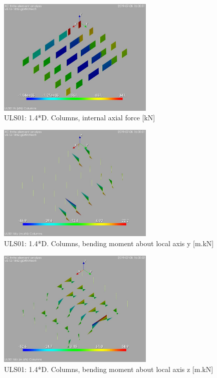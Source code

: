 \begin{figure}
\begin{center}
\includegraphics[width=75mm]{annex_res_columns/graphics/resSimplLC/ULS01columnsN}
\caption{ULS01: 1.4*D. Columns, internal axial force [kN]}
\end{center}
\end{figure}
\begin{figure}
\begin{center}
\includegraphics[width=75mm]{annex_res_columns/graphics/resSimplLC/ULS01columnsMy}
\caption{ULS01: 1.4*D. Columns, bending moment about local axis y [m.kN]}
\end{center}
\end{figure}
\begin{figure}
\begin{center}
\includegraphics[width=75mm]{annex_res_columns/graphics/resSimplLC/ULS01columnsMz}
\caption{ULS01: 1.4*D. Columns, bending moment about local axis z [m.kN]}
\end{center}
\end{figure}

